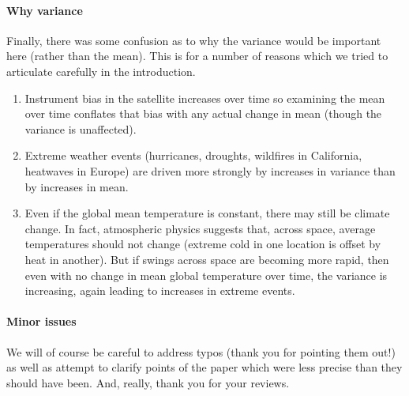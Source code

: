 \documentclass[11pt]{article}
\begin{document}
\paragraph{Why variance} Finally, there was some confusion as to why the variance would be
important here (rather than the mean). This is for a number of reasons
which we tried to articulate carefully in the introduction.
\begin{enumerate}
\item Instrument bias in the satellite increases over time so
  examining the mean over time conflates that bias with any actual
  change in mean (though the variance is unaffected).
\item Extreme weather events (hurricanes, droughts, wildfires in
  California, heatwaves in Europe) are driven more strongly by
  increases in variance than by increases in mean.
\item Even if the global mean temperature is constant, there may still
  be climate change. In fact, atmospheric physics suggests that,
  across space, average temperatures should not change (extreme cold
  in one location is offset by heat in another). But if swings across
  space are becoming more rapid, then even with no change in mean global
  temperature over time, the variance is increasing, again leading to
  increases in extreme events.
\end{enumerate}

\paragraph{Minor issues} We will of course be careful to address typos
(thank you for pointing them out!) as well as attempt to clarify
points of the paper which were less precise than they should have
been. And, really, thank you for your reviews. 









\end{document}
